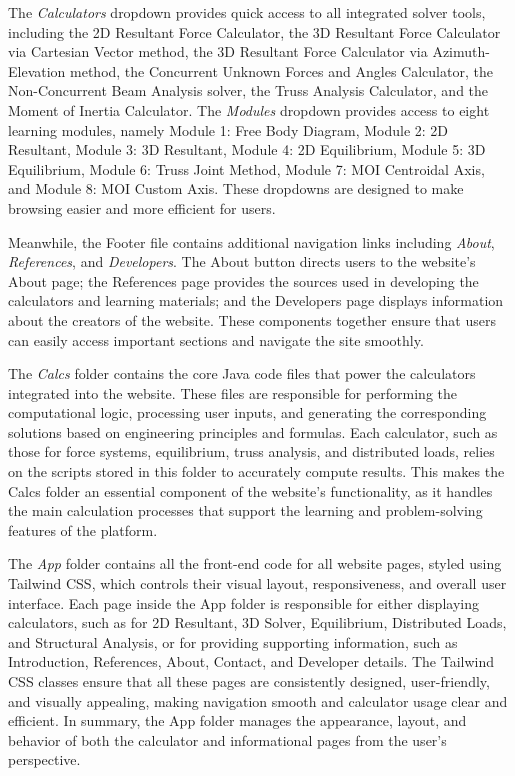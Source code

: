 The \textit{Calculators} dropdown provides quick access to all 
integrated solver tools, including the 2D Resultant Force Calculator, 
the 3D Resultant Force Calculator via Cartesian Vector method, the 3D 
Resultant Force Calculator via Azimuth-Elevation method, the 
Concurrent Unknown Forces and Angles Calculator, the Non-Concurrent 
Beam Analysis solver, the Truss Analysis Calculator, and the Moment 
of Inertia Calculator. The \textit{Modules} dropdown provides access 
to eight learning modules, namely Module 1: Free Body Diagram, Module 
2: 2D Resultant, Module 3: 3D Resultant, Module 4: 2D Equilibrium, 
Module 5: 3D Equilibrium, Module 6: Truss Joint Method, Module 7: MOI 
Centroidal Axis, and Module 8: MOI Custom Axis. These dropdowns are 
designed to make browsing easier and more efficient for users.

Meanwhile, the Footer file contains 
additional navigation links including \textit{About}, 
\textit{References}, and \textit{Developers}. The 
About button directs users to the website's About page; the 
References page provides the sources used in developing the 
calculators and learning materials; and the Developers page displays 
information about the creators of the website. These components 
together ensure that users can easily access important sections and 
navigate the site smoothly.

The \textit{Calcs} folder contains the core Java code files that 
power the calculators integrated into the website. These files are 
responsible for performing the computational logic, processing user 
inputs, and generating the corresponding solutions based on 
engineering principles and formulas. Each calculator, such as those 
for force systems, equilibrium, truss analysis, and distributed 
loads, relies on the scripts stored in this folder to accurately 
compute results. This makes the Calcs folder an essential component 
of the website's functionality, as it handles the main calculation 
processes that support the learning and problem-solving features of 
the platform.

The \textit{App} folder contains all the front-end code for all 
website pages, styled using Tailwind CSS, which controls their visual 
layout, responsiveness, and overall user interface. Each page inside 
the App folder is responsible for either displaying calculators, such 
as for 2D Resultant, 3D Solver, Equilibrium, Distributed Loads, and 
Structural Analysis, or for providing supporting information, such as 
Introduction, References, About, Contact, and Developer details. The 
Tailwind CSS classes ensure that all these pages are consistently 
designed, user-friendly, and visually appealing, making navigation 
smooth and calculator usage clear and efficient. In summary, the App 
folder manages the appearance, layout, and behavior of both the 
calculator and informational pages from the user's perspective.


